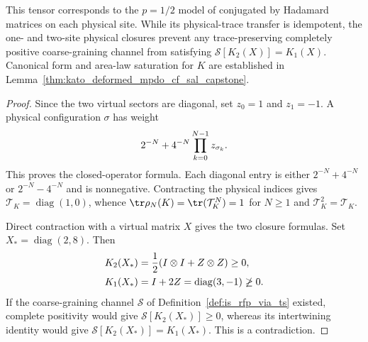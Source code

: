 \begin{lemma}
    This tensor corresponds to the $p=1/2$ model of
    \cite[lines~709--838]{Kato2024Exact} conjugated by Hadamard matrices on each
    physical site. While its physical-trace transfer is idempotent, the one- and
    two-site physical closures prevent any trace-preserving completely positive
    coarse-graining channel from satisfying $\mathcal S[K_2(X)]=K_1(X)$.
    Canonical form and area-law saturation for $K$ are established in
    Lemma~\ref{thm:kato_deformed_mpdo_cf_sal_capstone}.
\end{lemma}

\begin{proof}
    \leanok
    Since the two virtual sectors are diagonal, set $z_0=1$ and $z_1=-1$.
    A physical configuration $\sigma$ has weight
    \begin{align}
        2^{-N}+4^{-N}\prod_{k=0}^{N-1}z_{\sigma_k}.
        \notag
    \end{align}
    This proves the closed-operator formula. Each diagonal entry is either
    $2^{-N}+4^{-N}$ or $2^{-N}-4^{-N}$ and is nonnegative. Contracting the
    physical indices gives $\mathcal T_K=\operatorname{diag}(1,0)$, whence
    $\tr\rho_N(K)=\tr(\mathcal T_K^N)=1$ for $N\geq1$ and
    $\mathcal T_K^2=\mathcal T_K$.

    Direct contraction with a virtual matrix $X$ gives the two closure
    formulas. Set $X_* = \operatorname{diag}(2,8)$. Then
    \begin{align}
        K_2(X_*) & =\frac12(I\otimes I+Z\otimes Z)\geq0,
        \notag                                               \\
        K_1(X_*) & =I+2Z=\operatorname{diag}(3,-1)\not\geq0.
        \notag
    \end{align}
    If the coarse-graining channel $\mathcal S$ of
    Definition~\ref{def:is_rfp_via_ts} existed, complete positivity would give
    $\mathcal S[K_2(X_*)]\geq0$, whereas its intertwining identity would give
    $\mathcal S[K_2(X_*)]=K_1(X_*)$. This is a contradiction.
\end{proof}

